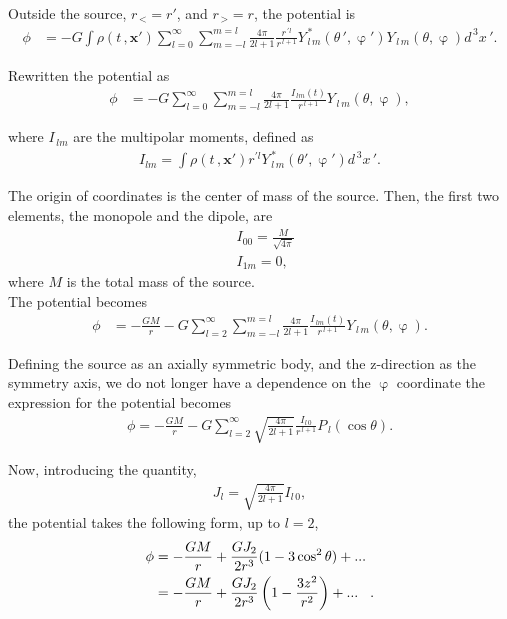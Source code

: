 Outside the source, $r_{\, <} = r'$,  and $r_{\, >} = r$, the potential is
\begin{align}
\phi &= -G \int \rho(t\,, \mathbf{x'}) \sum ^{\infty}_{l =0} \sum ^{m = l}_{m =-l} \frac{4\pi}{2l+1}\frac{r^{\,'l}}{r^{\, l+1}} Y ^ {\,*}_{\,l\,m} (\theta \, ', \upvarphi') Y _{\,l\,m} (\theta, \upvarphi) d^{\,3}x\,'.
\end{align}

Rewritten the potential as
\begin{align}
\phi &=   -G  \sum ^{\infty}_{l =0} \sum ^{m = l}_{m =-l}\frac{4\pi}{2l+1} \frac{I_{\,lm}(t)}{r^{\, l+1}}Y _{\,l\,m} (\theta, \upvarphi),
\end{align}

where $I_{\,lm}$ are the multipolar moments, defined as \cite{GravityPoisson}
\begin{align}
I_{lm} = \int \rho(t\,, \mathbf{x'}) r^{'l}Y ^ {\,*}_{\,l\,m} (\theta', \upvarphi')d^{\,3}x\,'.
\end{align}

The origin of coordinates is the center of mass of the source. Then, the first two elements, the monopole and the dipole, are
\begin{align}
&I_{00} = \frac{M}{\sqrt{4\pi}}\\
&I_{1m} = 0,
\end{align}
where $M$ is the total mass of the source.\\

The potential becomes
\begin{align}
\phi &=   -\frac{GM}{r}  - G \sum ^{\infty}_{l =2} \sum ^{m = l}_{m =-l}\frac{4\pi}{2l+1} \frac{I_{\,lm}(t)}{r^{\, l+1}}Y _{\,l\,m} (\theta, \upvarphi).
\end{align}

Defining the source as an axially symmetric body, and the z-direction as the symmetry axis, we do not longer have a dependence on the $\upvarphi$ coordinate the expression for the potential becomes
\begin{align}
\phi = -\frac{GM}{r} - G\sum ^{\infty}_{l =2} \sqrt{\frac{4\pi}{2l+1}} \frac{I_{l\,0}}{r^{\, l+1}}P _{\,l}  (\cos \theta).
\end{align}

Now, introducing the quantity,
\begin{align}
J_l = \sqrt{\frac{4\pi}{2l+1}} I_{l\,0},
\label{eq: definitionJl}
\end{align}
the potential takes the following form, up to $l=2$,
\begin{align*}
\phi &= -\frac{GM}{r} + \frac{GJ_2}{2r^3}(1-3\cos^2\theta) + ...\\
&=-\frac{GM}{r} + \frac{GJ_2}{2r^3}\left(1-\frac{3z^2}{r^2}\right) + ... \hspace{0.3cm}.
\end{align*}

